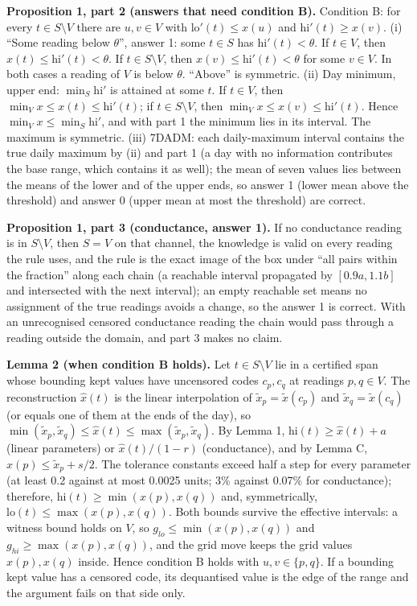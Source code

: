 ﻿\documentclass[12pt]{article}
\begin{document}
\textbf{Proposition 1, part 2 (answers that need condition B).} Condition B: for every $t \in S \setminus V$ there are $u, v \in V$ with $\mathrm{lo}'(t) \le x(u)$ and $\mathrm{hi}'(t) \ge x(v)$. (i) ``Some reading below $\theta$'', answer 1: some $t \in S$ has $\mathrm{hi}'(t) < \theta$. If $t \in V$, then $x(t) \le \mathrm{hi}'(t) < \theta$. If $t \in S \setminus V$, then $x(v) \le \mathrm{hi}'(t) < \theta$ for some $v \in V$. In both cases a reading of $V$ is below $\theta$. ``Above'' is symmetric. (ii) Day minimum, upper end: $\min_{S} \mathrm{hi}'$ is attained at some $t$. If $t \in V$, then $\min_V x \le x(t) \le \mathrm{hi}'(t)$; if $t \in S \setminus V$, then $\min_V x \le x(v) \le \mathrm{hi}'(t)$. Hence $\min_V x \le \min_S \mathrm{hi}'$, and with part 1 the minimum lies in its interval. The maximum is symmetric. (iii) 7DADM: each daily-maximum interval contains the true daily maximum by (ii) and part 1 (a day with no information contributes the base range, which contains it as well); the mean of seven values lies between the means of the lower and of the upper ends, so answer 1 (lower mean above the threshold) and answer 0 (upper mean at most the threshold) are correct.

\textbf{Proposition 1, part 3 (conductance, answer 1).} If no conductance reading is in $S \setminus V$, then $S = V$ on that channel, the knowledge is valid on every reading the rule uses, and the rule is the exact image of the box under ``all pairs within the fraction'' along each chain (a reachable interval propagated by $[0.9a, 1.1b]$ and intersected with the next interval); an empty reachable set means no assignment of the true readings avoids a change, so the answer 1 is correct. With an unrecognised censored conductance reading the chain would pass through a reading outside the domain, and part 3 makes no claim.

\textbf{Lemma 2 (when condition B holds).} Let $t \in S \setminus V$ lie in a certified span whose bounding kept values have uncensored codes $c_p, c_q$ at readings $p, q \in V$. The reconstruction $\hat{x}(t)$ is the linear interpolation of $\tilde{x}_p = \tilde{x}(c_p)$ and $\tilde{x}_q = \tilde{x}(c_q)$ (or equals one of them at the ends of the day), so $\min(\tilde{x}_p, \tilde{x}_q) \le \hat{x}(t) \le \max(\tilde{x}_p, \tilde{x}_q)$. By Lemma 1, $\mathrm{hi}(t) \ge \hat{x}(t) + a$ (linear parameters) or $\hat{x}(t)/(1-r)$ (conductance), and by Lemma C, $x(p) \le \tilde{x}_p + s/2$. The tolerance constants exceed half a step for every parameter (at least 0.2 against at most 0.0025 units; 3\% against 0.07\% for conductance); therefore, $\mathrm{hi}(t) \ge \min(x(p), x(q))$ and, symmetrically, $\mathrm{lo}(t) \le \max(x(p), x(q))$. Both bounds survive the effective intervals: a witness bound holds on $V$, so $g_{lo} \le \min(x(p), x(q))$ and $g_{hi} \ge \max(x(p), x(q))$, and the grid move keeps the grid values $x(p), x(q)$ inside. Hence condition B holds with $u, v \in \{p, q\}$. If a bounding kept value has a censored code, its dequantised value is the edge of the range and the argument fails on that side only.
\end{document}
